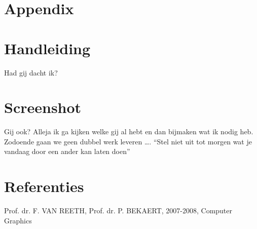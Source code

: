 \documentclass[a4paper,11pt,oneside, titlepage]{article}
\begin{document}
\section{Appendix}
\appendix
\section{Handleiding}
Had gij dacht ik?
\section{Screenshot}
Gij ook? Alleja ik ga kijken welke gij al hebt en dan bijmaken wat ik nodig heb. Zodoende gaan
we geen dubbel werk leveren \ldots. ``Stel niet uit tot morgen wat je vandaag door een ander
kan laten doen''
\section{Referenties}
Prof. dr. F. VAN REETH, Prof. dr. P. BEKAERT, 2007-2008, Computer Graphics 
\end{document}
